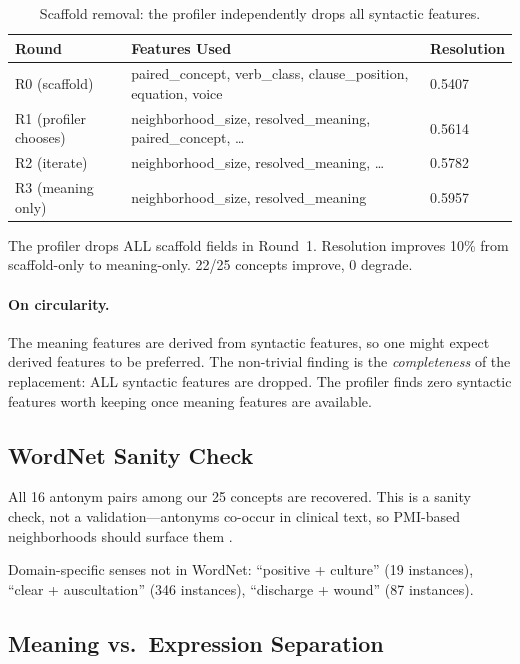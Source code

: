 \documentclass[11pt,a4paper]{article}
\begin{document}
\begin{table}[h]
\centering
\small
\begin{tabular}{lll}
\toprule
Round & Features Used & Resolution \\
\midrule
R0 (scaffold) & paired\_concept, verb\_class, clause\_position, equation, voice & 0.5407 \\
R1 (profiler chooses) & neighborhood\_size, resolved\_meaning, paired\_concept, \ldots & 0.5614 \\
R2 (iterate) & neighborhood\_size, resolved\_meaning, \ldots & 0.5782 \\
R3 (meaning only) & neighborhood\_size, resolved\_meaning & 0.5957 \\
\bottomrule
\end{tabular}
\caption{Scaffold removal: the profiler independently drops all syntactic features.}
\label{tab:scaffold}
\end{table}

The profiler drops ALL scaffold fields in Round~1. Resolution improves 10\% from scaffold-only to meaning-only. 22/25 concepts improve, 0 degrade.

\paragraph{On circularity.} The meaning features are derived from syntactic features, so one might expect derived features to be preferred. The non-trivial finding is the \emph{completeness} of the replacement: ALL syntactic features are dropped. The profiler finds zero syntactic features worth keeping once meaning features are available.

\subsection{WordNet Sanity Check}

All 16 antonym pairs among our 25 concepts are recovered. This is a sanity check, not a validation---antonyms co-occur in clinical text, so PMI-based neighborhoods should surface them \citep{mohammad2013}.

Domain-specific senses not in WordNet: ``positive + culture'' (19 instances), ``clear + auscultation'' (346 instances), ``discharge + wound'' (87 instances).

\subsection{Meaning vs.\ Expression Separation}
\end{document}

